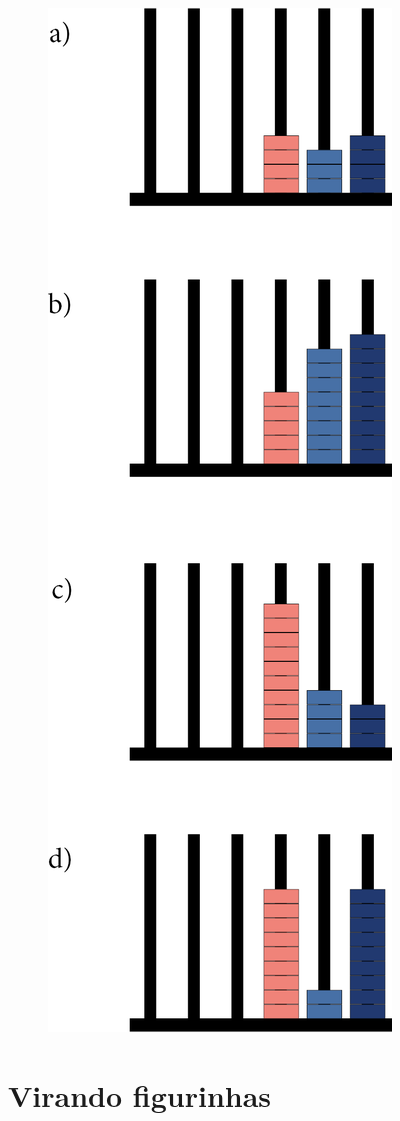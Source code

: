 \begin{figure}[htpb!]
\includegraphics[scale=1]{./media/image16.png}
\end{figure}

\chapter{Virando figurinhas}

